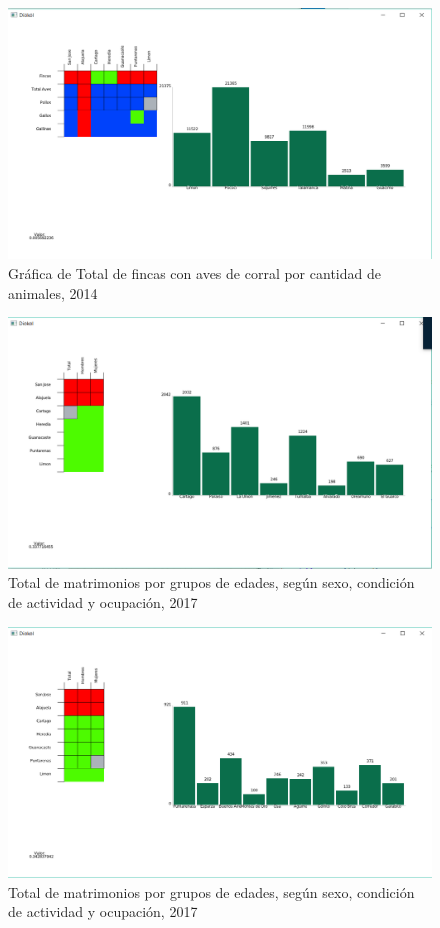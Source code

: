 \documentclass{article}
\begin{document}
\begin{figure}[h!]
\centering
\includegraphics[scale=0.2]{2.png}
\caption{Gráfica de Total de fincas con aves de corral por cantidad de animales, 2014}
\label{fig:Captura 3}
\end{figure}


\begin{figure}[h!]
\centering
\includegraphics[scale=0.2]{3.png}
\caption{Total de matrimonios por grupos de edades, según sexo, condición de actividad y ocupación, 2017}
\label{fig:Captura 4}
\end{figure}


\begin{figure}[h!]
\centering
\includegraphics[scale=0.2]{4.png}
\caption{Total de matrimonios por grupos de edades, según sexo, condición de actividad y ocupación, 2017}
\label{fig:Captura 5}
\end{figure}
\end{document}
